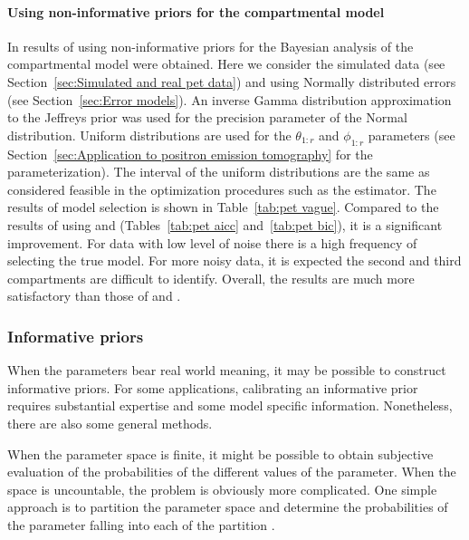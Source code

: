 \paragraph{Using non-informative priors for the \pet compartmental model}

In \cite{Zhou2013} results of using non-informative priors for the Bayesian analysis of the \pet compartmental model were obtained. Here we consider the simulated data (see Section~\ref{sec:Simulated and real pet data}) and using Normally distributed errors (see Section~\ref{sec:Error models}). An inverse Gamma distribution approximation to the Jeffreys prior was used for the precision parameter of the Normal distribution. Uniform distributions are used for the $\theta_{1:r}$ and $\phi_{1:r}$ parameters (see Section~\ref{sec:Application to positron emission tomography} for the parameterization). The interval of the uniform distributions are the same as considered feasible in the optimization procedures such as the \nls estimator. The results of model selection is shown in Table~\ref{tab:pet vague}. Compared to the results of using \aicc and \bic (Tables~\ref{tab:pet aicc} and~\ref{tab:pet bic}), it is a significant improvement. For data with low level of noise there is a high frequency of selecting the true model. For more noisy data, it is expected the second and third compartments are difficult to identify. Overall, the results are much more satisfactory than those of \aicc and \bic.



\subsubsection{Informative priors}
\label{ssub:Informative priors}

When the parameters bear real world meaning, it may be possible to construct informative priors. For some applications, calibrating an informative prior requires substantial expertise and some model specific information. Nonetheless, there are also some general methods.

When the parameter space is finite, it might be possible to obtain subjective evaluation of the probabilities of the different values of the parameter. When the space is uncountable, the problem is obviously more complicated. One simple approach is to partition the parameter space and determine the probabilities of the parameter falling into each of the partition \cite[][sec.~3.2.2]{Robert:2007tc}.

